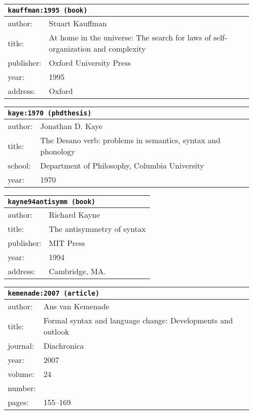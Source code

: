 \documentclass{article}
\begin{document}
\bigskip

\begin{tabular}{p{}p{}}
\multicolumn{2}{l}{\texttt{kauffman:1995 (book)}}\\
\hline
author: & Stuart Kauffman\\
title: & At home in the universe: The search for laws of self-organization and complexity\\
publisher: & Oxford University Press\\
year: & 1995\\
address: & Oxford\\
\end{tabular}

\bigskip

\begin{tabular}{p{}p{}}
\multicolumn{2}{l}{\texttt{kaye:1970 (phdthesis)}}\\
\hline
author: & Jonathan D. Kaye\\
title: & The Desano verb: problems in semantics, syntax and phonology\\
school: & Department of Philosophy, Columbia University\\
year: & 1970\\
\end{tabular}

\bigskip

\begin{tabular}{p{}p{}}
\multicolumn{2}{l}{\texttt{kayne94antisymm (book)}}\\
\hline
author: & Richard Kayne\\
title: & The antisymmetry of syntax\\
publisher: & MIT Press\\
year: & 1994\\
address: & Cambridge, MA.\\
\end{tabular}

\bigskip

\begin{tabular}{p{}p{}}
\multicolumn{2}{l}{\texttt{kemenade:2007 (article)}}\\
\hline
author: & Ans {van Kemenade}\\
title: & Formal syntax and language change: Developments and outlook\\
journal: & Diachronica\\
year: & 2007\\
volume: & 24\\
number: & \\
pages: & 155--169\\
\end{tabular}
\end{document}
